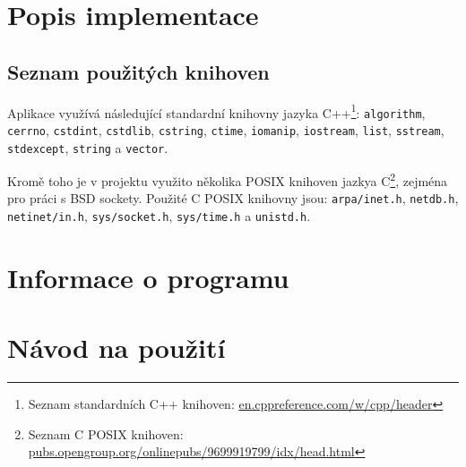 \documentclass[a4paper,12pt]{article}
\begin{document}
\section{Popis implementace}

\subsection{Seznam použitých knihoven}

Aplikace využívá následující standardní knihovny jazyka C++\footnote{Seznam standardních C++ knihoven: \url{en.cppreference.com/w/cpp/header}}: 
\texttt{algorithm},
\texttt{cerrno},
\texttt{cstdint},
\texttt{cstdlib},
\texttt{cstring},
\texttt{ctime},
\texttt{iomanip},
\texttt{iostream},
\texttt{list},
\texttt{sstream},
\texttt{stdexcept},
\texttt{string} a
\texttt{vector}.

Kromě toho je v projektu využito několika POSIX knihoven jazkya C\footnote{Seznam C POSIX knihoven: \url{pubs.opengroup.org/onlinepubs/9699919799/idx/head.html}}, zejména pro práci s BSD sockety. Použité C POSIX knihovny jsou:
\texttt{arpa/inet.h},
\texttt{netdb.h},
\texttt{netinet/in.h},
\texttt{sys/socket.h},
\texttt{sys/time.h} a
\texttt{unistd.h}.


\section{Informace o programu}

\section{Návod na použití}
\end{document}
